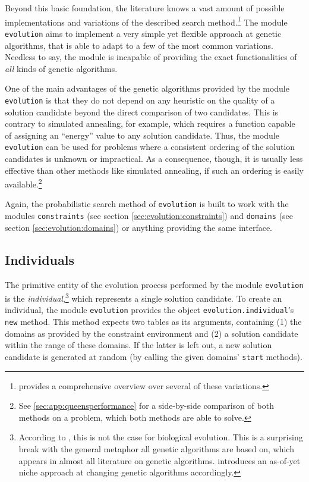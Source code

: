 Beyond this basic foundation, the literature knows a vast amount of possible implementations and variations of the described search method.\footnote{\cite{EibenSmith2007} provides a comprehensive overview over several of these variations.} The module \texttt{evolution} aims to implement a very simple yet flexible approach at genetic algorithms, that is able to adapt to a few of the most common variations. Needless to say, the module is incapable of providing the exact functionalities of \emph{all} kinds of genetic algorithms.

One of the main advantages of the genetic algorithms provided by the module \texttt{evolution} is that they do not depend on any heuristic on the quality of a solution candidate beyond the direct comparison of two candidates. This is contrary to simulated annealing, for example, which requires a function capable of assigning an ``energy'' value to any solution candidate. Thus, the module \texttt{evolution} can be used for problems where a consistent ordering of the solution candidates is unknown or impractical. As a consequence, though, it is usually less effective than other methods like simulated annealing, if such an ordering is easily available.\footnote{See \ref{sec:app:queensperformance} for a side-by-side comparison of both methods on a problem, which both methods are able to solve.}

Again, the probabilistic search method of \texttt{evolution} is built to work with the modules \texttt{constraints} (see section \ref{sec:evolution:constraints}) and \texttt{domains} (see section \ref{sec:evolution:domains}) or anything providing the same interface.

\subsection{Individuals}
\label{sec:evolution:individuals}

The primitive entity of the evolution process performed by the module \texttt{evolution} is the \emph{individual},\footnote{According to \cite{Dawkins1990}, this is not the case for biological evolution. This is a surprising break with the general metaphor all genetic algorithms are based on, which appears in almost all literature on genetic algorithms. \cite{CornoReordaSquillero1998} introduces an as-of-yet niche approach at changing genetic algorithms accordingly.} which represents a single solution candidate. To create an individual, the module \texttt{evolution} provides the object \texttt{evolution.individual}'s  \texttt{new} method. This method expects two tables as its arguments, containing (1) the domains as provided by the constraint environment and (2) a solution candidate within the range of these domains. If the latter is left out, a new solution candidate is generated at random (by calling the given domains' \texttt{start} methods).


